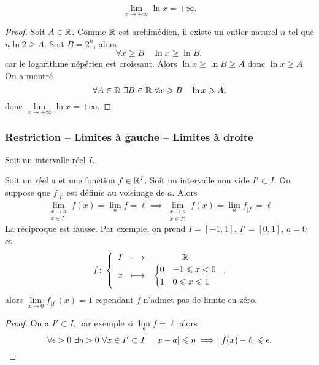 \begin{theo}
  \begin{equation}
    \lim\limits_{x \to +\infty} \ln x = + \infty.
  \end{equation}
\end{theo}
\begin{proof}
  Soit \(A \in \mathbb{R}\). Comme \(\mathbb{R}\) est archimédien, il existe un entier naturel 
  \(n\) tel que \(n \ln 2 \geqslant A\). Soit \(B=2^n\), alors
  \begin{equation}
    \forall x \geqslant B \quad \ln x \geqslant \ln B,
  \end{equation}
  car le logarithme népérien est croissant. Alors \(\ln x \geqslant \ln B 
  \geqslant A\) donc \(\ln x \geqslant A\). On a montré
  \begin{equation}
    \forall A \in \mathbb{R} \ \exists B \in \mathbb{R} \ \forall x \geqslant B \quad \ln x 
    \geqslant A,
  \end{equation}
  donc \(\lim\limits_{x \to +\infty} \ln x = + \infty\).
\end{proof}

\subsubsection{Restriction -- Limites à gauche -- Limites à droite}
Soit un intervalle réel \(I\).
\begin{prop}
  Soit un réel \(a\) et une fonction \(f \in \mathbb{R}^I\). Soit un intervalle non vide 
  \(I' \subset I\). On suppose que \(f_{|I^{'}}\) est définie au voisinage de 
  \(a\). Alors
  \begin{equation}
    \lim\limits_{\begin{array}{l} x \to a \\ x \in 
      I\end{array}}f(x)=\lim\limits_{a}f=\ell \implies 
      \lim\limits_{\begin{array}{l} x \to a \\ x \in 
      I'\end{array}}f(x)=\lim\limits_{a}f_{|I^{'}}=\ell
  \end{equation}
  La réciproque est fausse. Par exemple, on prend \(I=[-1,1]\), \(I'=[0,1]\), 
  \(a=0\) et
  \begin{equation}
    f\colon \left\{\begin{array}{ccc} I & \longrightarrow &\mathbb{R}\\ x & \longmapsto & 
      \begin{cases} 0 & -1 \leqslant x < 0 \\ 1 & 0 \leqslant x \leqslant 1
      \end{cases}
     \end{array} \right.,
  \end{equation}
  alors \(\lim\limits_{x \to 0}f_{|I^{'}}(x)=1\) cependant \(f\) n'admet pas de 
  limite en zéro.
\end{prop}
\begin{proof}
  On a \( I' \subset I\), par exemple si \(\lim\limits_{a} f =\ell\) alors
  \begin{equation}
    \forall \epsilon > 0 \ \exists \eta > 0 \ \forall x \in I' \subset I \quad 
    \left\lvert x-a\right\rvert \leqslant \eta \implies \left\lvert f(x) - \ell\right\rvert \leqslant \epsilon.
  \end{equation}
\end{proof}


